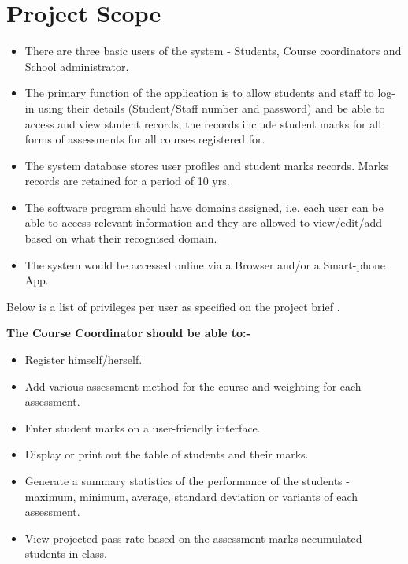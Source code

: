 \documentclass[10pt,onecolumn]{lab}
\begin{document}
\section{Project Scope}
\begin{itemize}

\item There are three basic users of the system - Students, Course coordinators and School administrator.
\item The primary function of the application is to allow students and staff  to log-in using their details (Student/Staff number and password) and be able to access and view student records, the records include student marks for all forms of assessments for all courses registered for. 
\item The system database stores user profiles and student marks records. Marks records are retained for a period of 10 yrs.
\item The software program should have domains assigned, i.e. each user can be able to access relevant  information and they are allowed to view/edit/add based on what their recognised  domain.
\item  The system would be accessed online via a Browser and/or a Smart-phone App.

\end{itemize}

Below is a list of privileges per user as specified on the project brief \cite{ref9}.

\textbf{The Course Coordinator should be able to:-}
\begin{itemize}
\item Register himself/herself.
\item Add various assessment method for the course and weighting for each assessment.
\item Enter student marks on a user-friendly interface.
\item Display or print out the table of students and their marks.
\item Generate a summary statistics of the performance of the students - maximum, minimum, average, standard deviation or variants of each assessment.  
\item View projected pass rate based on the assessment marks accumulated students in class.
\end{itemize}
\end{document}
